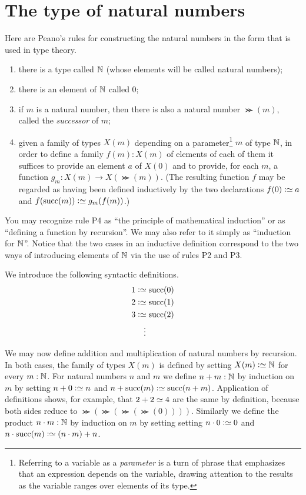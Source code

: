 \section{The type of natural numbers}
\label{sec:natural-numbers}

Here are Peano's rules\cite{peano-principia} for constructing the natural numbers in the form that is used in type theory.
\begin{enumerate}[label=P\arabic*:]
\item there is a type called $\mathbb{N}$ (whose elements will be called natural numbers);
\item there is an element of $\mathbb{N}$ called $0$;
\item if $m$ is a natural number, then there is also a natural number $\Succ(m)$, called the \emph{successor} of $m$;
\item given a family of types $X(m)$ depending on a parameter\footnote{%
  Referring to a variable as a \emph{parameter} is a turn of phrase that emphasizes that an expression depends on the variable,
  drawing attention to the results as the variable ranges over elements of its type.}
  $m$ of type $\mathbb{N}$, in order to define a family $f(m) : X(m)$ of elements of each of them it suffices to provide an element $a$ of $X(0)$ and
  to provide, for each $m$, a function $g_m : X(m) \to X(\Succ(m))$.  (The resulting function $f$ may be regarded as having been defined inductively
  by the two declarations $f(0) \defeq a$ and $f(\Succ(m)) \defeq g_m(f(m))$.)
\end{enumerate}
\nopagebreak
You may recognize rule P4 as ``the principle of mathematical induction'' or as ``defining a function by recursion''.  We may also refer to it
simply as ``induction for $\mathbb{N}$''.  Notice that the two cases in an inductive definition correspond to the two ways of introducing elements of
$\mathbb{N}$ via the use of rules P2 and P3.

We introduce the following syntactic definitions.
\begin{align*}
 1 & \defeq \Succ(0) \\
 2 & \defeq \Succ(1) \\
 3 & \defeq \Succ(2) \\
   & \quad \vdots
\end{align*}

We may now define addition and multiplication of natural numbers by recursion.  In both cases, the family of types $X(m)$ is defined by setting
$X(m) \defeq \NN$ for every $m : \mathbb{N}$.  For natural numbers $n$ and $m$ we define $n+m : \mathbb{N}$ by induction on $m$ by setting $n+0\defeq n$ and
$n+\Succ(m)\defeq \Succ(n+m)$.  Application of definitions shows, for example, that $2+2 \jdeq 4$ are the same by definition, because both sides reduce
to $\Succ(\Succ(\Succ(\Succ(0))))$.  Similarly we define the product $n \cdot m : \mathbb{N}$ by induction on $m$ by setting setting $n\cdot 0\defeq 0$ and $n\cdot
\Succ(m)\defeq (n\cdot m) + n$.

